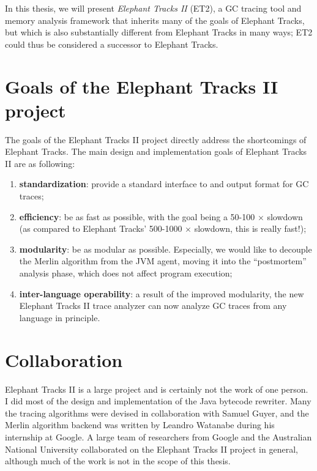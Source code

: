 In this thesis, we will present \emph{Elephant Tracks II} (ET2), a GC tracing tool and memory analysis framework that inherits many of
the goals of Elephant Tracks, but which is also substantially different from Elephant Tracks in many ways; ET2 could thus be considered
a successor to Elephant Tracks. 


\section{Goals of the Elephant Tracks II project}
The goals of the Elephant Tracks II project directly address the shortcomings of Elephant Tracks. The main design and implementation
goals of Elephant Tracks II are as following:

\begin{enumerate}
\item \textbf{standardization}: provide a standard interface to and output format for GC traces;
\item \textbf{efficiency}: be as fast as possible, with the goal being a 50-100 $\times$ slowdown (as compared to
  Elephant Tracks' 500-1000 $\times$ slowdown, this is really fast!);
\item \textbf{modularity}: be as modular as possible. Especially, we would like to decouple the Merlin algorithm from the
  JVM agent, moving it into the ``postmortem'' analysis phase, which does not affect program execution;
\item \textbf{inter-language operability}: a result of the improved modularity, the new Elephant Tracks II trace analyzer can
  now analyze GC traces from any language in principle.
\end{enumerate}

\section{Collaboration}
Elephant Tracks II is a large project and is certainly not the work of one person. I did most of the design and implementation of the
Java bytecode rewriter. Many the tracing algorithms were devised in collaboration with Samuel Guyer, and the Merlin algorithm backend was
written by Leandro Watanabe during his internship at Google. A large team of researchers from Google and the Australian National University
collaborated on the Elephant Tracks II project in general, although much of the work is not in the scope of this thesis.

